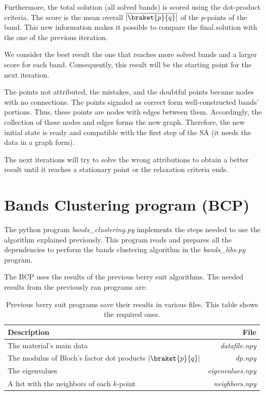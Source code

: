 \documentclass[a4paper,12pt]{report}
\begin{document}
\begin{appendices}
\begin{table}[H]
\end{table}


Furthermore,  the total solution (all solved bands) is scored using the dot-product criteria.
The score is the mean overall $\overline{\left|\braket{p}{q}\right|}$ of the $p$-points of the band.
This new information makes it possible to compare the final solution with the one of the previous iteration.

We consider the best result the one that reaches more solved bands and a larger score for each band.
Consequently, this result will be the starting point for the next iteration.

The points not attributed, the mistakes, and the doubtful points became nodes with no connections.
The points signaled as correct form well-constructed bands' portions.
Thus, these points are nodes with edges between them.
Accordingly, the collection of these nodes and edges forms the new graph.
Therefore, the new initial state is ready and compatible with the first step of the SA (it needs the data in a graph form).

The next iterations will try to solve the wrong attributions to obtain a better result until it reaches a stationary point or the relaxation criteria ends.




\section{Bands Clustering program (BCP)}

The python program \textit{bands\_clustering.py} implements the steps needed to use the algorithm explained previously. This program reads and prepares all the dependencies to perform the bands clustering algorithm in the \textit{bands\_libs.py} program.

The BCP uses the results of the previous berry suit algorithms. The needed results from the previously ran programs are:

\begin{table}[H]
    \center
    \caption{Previous berry suit programs save their results in various files. This table shows the required ones.}
    \begin{tabular}{lr}
        \hline
        Description & File \\
        \hline
        The material's main data & \textit{datafile.npy}\\
        The modulus of Bloch's factor dot products $\left|\braket{p}{q}\right|$ & \textit{dp.npy}\\
        The eigenvalues & \textit{eigenvalues.npy}\\
        A list with the neighbors of each $k$-point & \textit{neighbors.npy}\\


\end{tabular}
\end{table}
\end{appendices}
\end{document}
